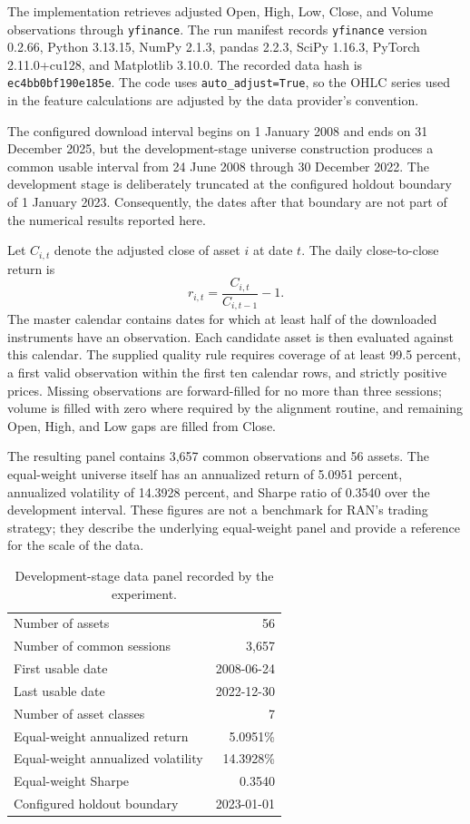 \documentclass[10pt]{article}
\begin{document}
The implementation retrieves adjusted Open, High, Low, Close, and Volume observations through \texttt{yfinance}. The run manifest records \texttt{yfinance} version 0.2.66, Python 3.13.15, NumPy 2.1.3, pandas 2.2.3, SciPy 1.16.3, PyTorch 2.11.0+cu128, and Matplotlib 3.10.0. The recorded data hash is \texttt{ec4bb0bf190e185e}. The code uses \texttt{auto\_adjust=True}, so the OHLC series used in the feature calculations are adjusted by the data provider's convention.

The configured download interval begins on 1 January 2008 and ends on 31 December 2025, but the development-stage universe construction produces a common usable interval from 24 June 2008 through 30 December 2022. The development stage is deliberately truncated at the configured holdout boundary of 1 January 2023. Consequently, the dates after that boundary are not part of the numerical results reported here.

Let $C_{i,t}$ denote the adjusted close of asset $i$ at date $t$. The daily close-to-close return is
\begin{equation}
r_{i,t}=\frac{C_{i,t}}{C_{i,t-1}}-1.
\end{equation}
The master calendar contains dates for which at least half of the downloaded instruments have an observation. Each candidate asset is then evaluated against this calendar. The supplied quality rule requires coverage of at least 99.5 percent, a first valid observation within the first ten calendar rows, and strictly positive prices. Missing observations are forward-filled for no more than three sessions; volume is filled with zero where required by the alignment routine, and remaining Open, High, and Low gaps are filled from Close.

The resulting panel contains 3,657 common observations and 56 assets. The equal-weight universe itself has an annualized return of 5.0951 percent, annualized volatility of 14.3928 percent, and Sharpe ratio of 0.3540 over the development interval. These figures are not a benchmark for RAN's trading strategy; they describe the underlying equal-weight panel and provide a reference for the scale of the data.

\begin{table}[tbp]
\centering
\caption{Development-stage data panel recorded by the experiment.}
\begin{tabular}{lr}
\toprule
Number of assets & 56\\
Number of common sessions & 3,657\\
First usable date & 2008-06-24\\
Last usable date & 2022-12-30\\
Number of asset classes & 7\\
Equal-weight annualized return & 5.0951\%\\
Equal-weight annualized volatility & 14.3928\%\\
Equal-weight Sharpe & 0.3540\\
Configured holdout boundary & 2023-01-01\\
\bottomrule
\end{tabular}
\end{table}
\end{document}
